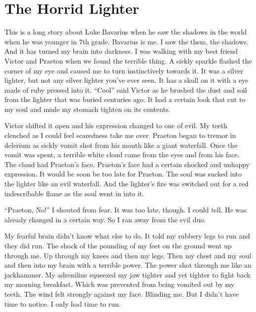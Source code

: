 \chapter{The Horrid Lighter}





This is a long story about Luke Bavarius when he saw the shadows in
the world when he was younger in 7th grade. Bavarius is me. I saw
the them, the shadows. And it has turned my brain into darkness. I
was walking with my best friend Victor and Praeton when we found
the terrible thing. A sickly sparkle flashed the corner of my eye
and caused me to turn instinctively towards it. It was a silver
lighter, but not any silver lighter you've ever seen. It has a
skull on it with a eye made of ruby pressed into it. ``Cool'' said
Victor as he brushed the dust and soil from the lighter that was
buried centuries ago. It had a certain look that cut to my soul and
made my stomach tighten on its contents.



Victor shifted it open and his expression changed to one of evil.
My teeth clenched as I could feel scaredness take me over. Praeton
began to tremor in delerium as sickly vomit shot from his mouth
like a giant waterfall. Once the vomit was spent, a terrible white
cloud came from the eyes and from his face. The cloud had Praeton's
face. Praeton's face had a certain shocked and unhappy expression.
It would be soon be too late for Praeton. The soul was sucked into
the lighter like an evil waterfall. And the lighter's fire was
switched out for a red indescribable flame as the soul went in into
it.



``Praeton, No!'' I shouted from fear. It was too late, though. I
could tell. He was already changed in a certain way. So I ran away
from the evil duo.



My fearful brain didn't know what else to do. It told my rubbery
legs to run and they did run. The shock of the pounding of my feet
on the ground went up through me. Up through my knees and then my
legs. Then my chest and my soul and then into my brain with a
terrible power. The power shot through me like an jackhammer. My
adreniline squeezed my jaw tighter and yet tighter to fight back my
morning breakfast. Which was prevented from being vomited out by my
teeth. The wind felt strongly against my face. Blinding me. But I
didn't have time to notice. I only had time to run.



